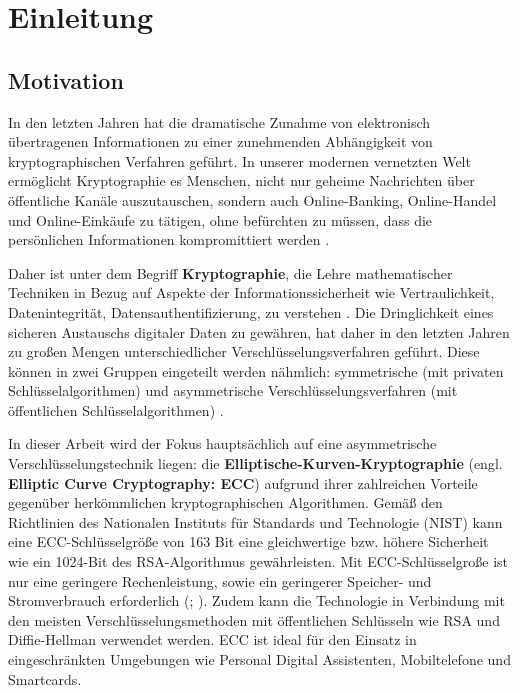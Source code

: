 \chapter{Einleitung}

\section{Motivation}


In den letzten Jahren hat die dramatische Zunahme von elektronisch übertragenen Informationen zu einer zunehmenden Abhängigkeit von kryptographischen Verfahren geführt. 
In unserer modernen vernetzten Welt ermöglicht Kryptographie es Menschen, nicht nur geheime Nachrichten über öffentliche Kanäle auszutauschen, sondern auch Online-Banking, Online-Handel und Online-Einkäufe zu tätigen, ohne befürchten zu müssen, dass die persönlichen Informationen kompromittiert werden \cite{werner}. 

Daher ist unter dem Begriff \textbf{Kryptographie}, die Lehre mathematischer Techniken in Bezug auf Aspekte der Informationssicherheit wie Vertraulichkeit, Datenintegrität, Datensauthentifizierung, zu verstehen \cite{menezes:1997}.
Die Dringlichkeit eines sicheren Austauschs digitaler Daten zu gewähren, hat daher in den letzten Jahren zu großen Mengen unterschiedlicher Verschlüsselungsverfahren geführt.
Diese können in zwei Gruppen eingeteilt werden nähmlich: symmetrische (mit privaten Schlüsselalgorithmen) und asymmetrische Verschlüsselungsverfahren (mit öffentlichen Schlüsselalgorithmen) \cite{menezes:1997}. 


In dieser Arbeit wird der Fokus hauptsächlich auf eine asymmetrische Verschlüsselungstechnik liegen: die \textbf{Elliptische-Kurven-Kryptographie} (engl. \textbf{Elliptic Curve Cryptography: ECC}) aufgrund ihrer zahlreichen Vorteile gegenüber herkömmlichen kryptographischen Algorithmen.
Gemäß den Richtlinien des Nationalen Instituts für Standards und Technologie (NIST) kann eine ECC-Schlüsselgröße von 163 Bit eine gleichwertige bzw. höhere Sicherheit wie ein 1024-Bit des RSA-Algorithmus gewährleisten. Mit ECC-Schlüsselgroße ist nur eine geringere Rechenleistung, sowie ein geringerer Speicher- und Stromverbrauch erforderlich (\cite{edoh}; \cite{sosax}). Zudem kann die Technologie in Verbindung mit den meisten Verschlüsselungsmethoden mit öffentlichen Schlüsseln wie RSA und Diffie-Hellman verwendet werden.
ECC ist ideal für den Einsatz in eingeschränkten Umgebungen wie Personal Digital Assistenten, Mobiltelefone und Smartcards. 


